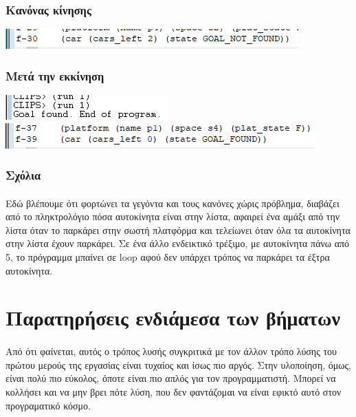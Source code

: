 \documentclass{article}
\begin{document}
    \subsubsection{Κανόνας κίνησης}
    \includegraphics[scale=0.5]{images/facts_window_b1_3.png}

    \subsubsection{Μετά την εκκίνηση}
    \includegraphics[scale=0.5]{images/dialog_window_b1_3.png}
    \includegraphics[scale=0.5]{images/facts_window_b1_4.png}

    \subsubsection{Σχόλια}
    \paragraph{}
    Εδώ βλέπουμε ότι φορτώνει τα γεγόντα και τους κανόνες χώρις πρόβλημα, διαβάζει από το πληκτρολόγιο πόσα αυτοκίνητα είναι στην λίστα, 
    αφαιρεί ένα αμάξι από την λίστα όταν το παρκάρει στην σωστή πλατφόρμα και τελείωνει όταν όλα τα αυτοκίνητα στην λίστα έχουν παρκάρει.
    Σε ένα άλλο ενδεικτικό τρέξιμο, με αυτοκίνητα πάνω από 5, το πρόγραμμα μπαίνει σε loop αφού δεν υπάρχει τρόπος να παρκάρει τα έξτρα αυτοκίνητα.

    \newpage
    \section{Παρατηρήσεις ενδιάμεσα των βήματων}
    \paragraph{}
    Από ότι φαίνεται, αυτός ο τρόπος λυσής συγκριτικά με τον άλλον τρόπο λύσης του πρώτου μερούς της εργασίας είναι τυχαίος και ίσως πιο αργός.
    Στην υλοποίηση, όμως, είναι πολύ πιο εύκολος, όποτε είναι πιο απλός για τον προγραμματιστή. Μπορεί να κολλήσει και να μην βρει πότε λύση,
    που δεν φαντάζομαι να είναι εφικτό αυτό στον προγραματικό κόσμο.
\end{document}
